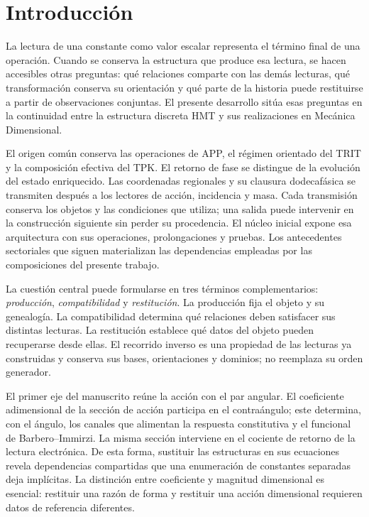 \begin{abstract}
Finalmente, bajo las
condiciones circular y térmica especificadas, una misma coordenada de masa
determina la frecuencia propia, dos longitudes recíprocas de producto
invariante y la ponderación térmica del ciclo. Los resultados reúnen así
producción, compatibilidad y restitución en una descripción matemática
común, con demostraciones explícitas y con la distinción entre cambio de
representación, transporte relativo y realización física.
\end{abstract}

\clearpage
\section{Introducción}
\enlargethispage{-3\baselineskip}
\label{md:introduccion}
La lectura de una constante como valor escalar representa el término final
de una operación. Cuando se conserva la estructura que produce esa lectura,
se hacen accesibles otras preguntas: qué relaciones comparte con las demás
lecturas, qué transformación conserva su orientación y qué parte de la
historia puede restituirse a partir de observaciones conjuntas. El presente
desarrollo sitúa esas preguntas en la continuidad entre la estructura discreta
HMT y sus realizaciones en Mecánica Dimensional.

El origen común conserva las operaciones de APP, el régimen orientado del
TRIT y la composición efectiva del TPK. El retorno de fase se distingue de
la evolución del estado enriquecido. Las coordenadas regionales y su
clausura dodecafásica se transmiten después a los lectores de acción,
incidencia y masa. Cada transmisión conserva los objetos y las condiciones
que utiliza; una salida puede intervenir en la construcción siguiente sin
perder su procedencia. El núcleo inicial expone esa arquitectura con sus
operaciones, prolongaciones y pruebas. Los antecedentes sectoriales que
siguen materializan las dependencias empleadas por las composiciones del
presente trabajo.

La cuestión central puede formularse en tres términos complementarios:
\emph{producción}, \emph{compatibilidad} y \emph{restitución}. La
producción fija el objeto y su genealogía. La compatibilidad determina qué
relaciones deben satisfacer sus distintas lecturas. La restitución establece
qué datos del objeto pueden recuperarse desde ellas. El recorrido inverso
es una propiedad de las lecturas ya construidas y conserva sus bases,
orientaciones y dominios; no reemplaza su orden generador.

El primer eje del manuscrito reúne la acción con el par angular. El
coeficiente adimensional de la sección de acción participa en el
contraángulo; este determina, con el ángulo, los canales que alimentan la
respuesta constitutiva y el funcional de Barbero--Immirzi. La misma sección
interviene en el cociente de retorno de la lectura electrónica. De esta
forma, sustituir las estructuras en sus ecuaciones revela dependencias
compartidas que una enumeración de constantes separadas deja implícitas.
La distinción entre coeficiente y magnitud dimensional es esencial:
restituir una razón de forma y restituir una acción dimensional requieren
datos de referencia diferentes.

